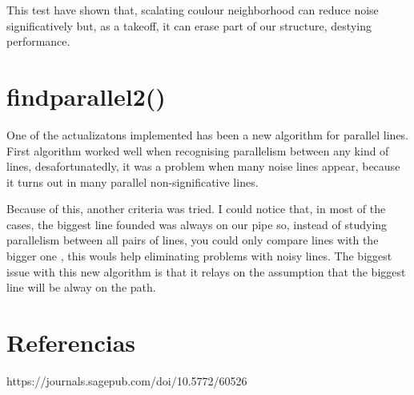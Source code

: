 \documentclass[12pt, a4paper]{article}
\begin{document}
This test have shown that, scalating coulour neighborhood can reduce noise significatively 
but, as a takeoff, it can erase part of our structure, destying performance.


\section{findparallel2()}

One of the actualizatons implemented has been a new algorithm for parallel lines. 
First algorithm worked well when recognising parallelism between any kind of lines, 
desafortunatedly, it was a problem when many noise lines appear, because it turns out in 
many parallel non-significative lines.

Because of this, another criteria was tried. I could notice that, in most of the cases, 
the biggest line founded was always on our pipe so, instead of studying parallelism between all
pairs of lines, you could only compare lines with the bigger one , this wouls help eliminating problems
with noisy lines. The biggest issue with this new algorithm is that it relays on the assumption that the 
biggest line will be alway on the path.

\section{Referencias}

https://journals.sagepub.com/doi/10.5772/60526

\end{document}
